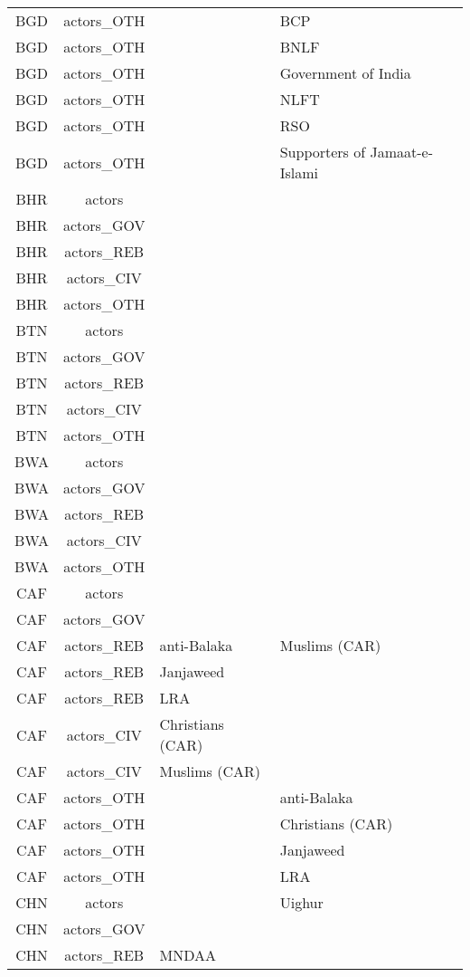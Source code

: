 \documentclass[12pt]{article}
\begin{document}
\begin{center}
\begin{longtable}{|c|c|p{7cm}|p{7cm}|}
  BGD & actors\_OTH &  & BCP \\ 
  BGD & actors\_OTH &  & BNLF \\ 
  BGD & actors\_OTH &  & Government of India \\ 
  BGD & actors\_OTH &  & NLFT \\ 
  BGD & actors\_OTH &  & RSO \\ 
  BGD & actors\_OTH &  & Supporters of Jamaat-e-Islami \\ 
  BHR & actors &  &  \\ 
  BHR & actors\_GOV &  &  \\ 
  BHR & actors\_REB &  &  \\ 
  BHR & actors\_CIV &  &  \\ 
  BHR & actors\_OTH &  &  \\ 
  BTN & actors &  &  \\ 
  BTN & actors\_GOV &  &  \\ 
  BTN & actors\_REB &  &  \\ 
  BTN & actors\_CIV &  &  \\ 
  BTN & actors\_OTH &  &  \\ 
  BWA & actors &  &  \\ 
  BWA & actors\_GOV &  &  \\ 
  BWA & actors\_REB &  &  \\ 
  BWA & actors\_CIV &  &  \\ 
  BWA & actors\_OTH &  &  \\ 
  CAF & actors &  &  \\ 
  CAF & actors\_GOV &  &  \\ 
  CAF & actors\_REB & anti-Balaka & Muslims (CAR) \\ 
  CAF & actors\_REB & Janjaweed &  \\ 
  CAF & actors\_REB & LRA &  \\ 
  CAF & actors\_CIV & Christians (CAR) &  \\ 
  CAF & actors\_CIV & Muslims (CAR) &  \\ 
  CAF & actors\_OTH &  & anti-Balaka \\ 
  CAF & actors\_OTH &  & Christians (CAR) \\ 
  CAF & actors\_OTH &  & Janjaweed \\ 
  CAF & actors\_OTH &  & LRA \\ 
  CHN & actors &  & Uighur \\ 
  CHN & actors\_GOV &  &  \\ 
  CHN & actors\_REB & MNDAA &  \\ 

\end{longtable}
\end{center}
\end{document}
